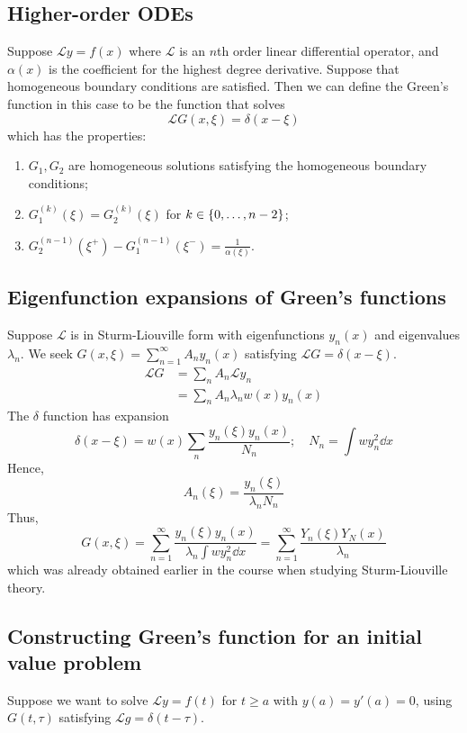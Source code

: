 \documentclass[a4paper]{article}
\begin{document}
\subsection{Higher-order ODEs}
Suppose \( \mathcal L y = f(x) \) where \( \mathcal L \) is an \( n \)th order linear differential operator, and \( \alpha(x) \) is the coefficient for the highest degree derivative.
Suppose that homogeneous boundary conditions are satisfied.
Then we can define the Green's function in this case to be the function that solves
\[
	\mathcal L G(x,\xi) = \delta(x-\xi)
\]
which has the properties:
\begin{enumerate}
	\item \( G_1, G_2 \) are homogeneous solutions satisfying the homogeneous boundary conditions;
	\item \( G_1^{(k)}(\xi) = G_2^{(k)}(\xi) \) for \( k \in \qty{0, \dots, n-2} \);
	\item \( G_2^{(n-1)}(\xi^+) - G_1^{(n-1)}(\xi^-) = \frac{1}{\alpha(\xi)} \).
\end{enumerate}

\subsection{Eigenfunction expansions of Green's functions}
Suppose \( \mathcal L \) is in Sturm-Liouville form with eigenfunctions \( y_n(x) \) and eigenvalues \( \lambda_n \).
We seek \( G(x,\xi) = \sum_{n=1}^\infty A_n y_n(x) \) satisfying \( \mathcal L G = \delta(x-\xi) \).
\begin{align*}
	\mathcal L G & = \sum_n A_n \mathcal L y_n        \\
	             & = \sum_n A_n \lambda_n w(x) y_n(x)
\end{align*}
The \( \delta \) function has expansion
\[
	\delta(x-\xi) = w(x) \sum_n \frac{y_n(\xi) y_n(x)}{N_n};\quad N_n = \int w y_n^2 \dd{x}
\]
Hence,
\[
	A_n(\xi) = \frac{y_n(\xi)}{\lambda_n N_n}
\]
Thus,
\[
	G(x,\xi) = \sum_{n=1}^\infty \frac{y_n(\xi) y_n(x)}{\lambda_n \int w y_n^2 \dd{x}} = \sum_{n=1}^\infty \frac{Y_n(\xi) Y_N(x)}{\lambda_n}
\]
which was already obtained earlier in the course when studying Sturm-Liouville theory.

\subsection{Constructing Green's function for an initial value problem}
Suppose we want to solve \( \mathcal L y = f(t) \) for \( t \geq a \) with \( y(a) = y'(a) = 0 \), using \( G(t, \tau) \) satisfying \( \mathcal L g = \delta(t - \tau) \).
\end{document}
